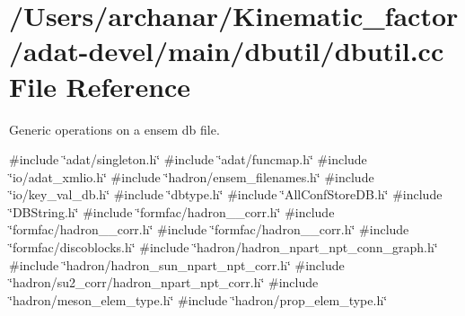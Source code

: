\hypertarget{adat-devel_2main_2dbutil_2dbutil_8cc}{}\section{/\+Users/archanar/\+Kinematic\+\_\+factor/adat-\/devel/main/dbutil/dbutil.cc File Reference}
\label{adat-devel_2main_2dbutil_2dbutil_8cc}


Generic operations on a ensem db file.  


{\ttfamily \#include \char`\"{}adat/singleton.\+h\char`\"{}}\newline
{\ttfamily \#include \char`\"{}adat/funcmap.\+h\char`\"{}}\newline
{\ttfamily \#include \char`\"{}io/adat\+\_\+xmlio.\+h\char`\"{}}\newline
{\ttfamily \#include \char`\"{}hadron/ensem\+\_\+filenames.\+h\char`\"{}}\newline
{\ttfamily \#include \char`\"{}io/key\+\_\+val\+\_\+db.\+h\char`\"{}}\newline
{\ttfamily \#include \char`\"{}dbtype.\+h\char`\"{}}\newline
{\ttfamily \#include \char`\"{}All\+Conf\+Store\+D\+B.\+h\char`\"{}}\newline
{\ttfamily \#include \char`\"{}D\+B\+String.\+h\char`\"{}}\newline
{\ttfamily \#include \char`\"{}formfac/hadron\+\_\+1pt\+\_\+corr.\+h\char`\"{}}\newline
{\ttfamily \#include \char`\"{}formfac/hadron\+\_\+2pt\+\_\+corr.\+h\char`\"{}}\newline
{\ttfamily \#include \char`\"{}formfac/hadron\+\_\+3pt\+\_\+corr.\+h\char`\"{}}\newline
{\ttfamily \#include \char`\"{}formfac/discoblocks.\+h\char`\"{}}\newline
{\ttfamily \#include \char`\"{}hadron/hadron\+\_\+npart\+\_\+npt\+\_\+conn\+\_\+graph.\+h\char`\"{}}\newline
{\ttfamily \#include \char`\"{}hadron/hadron\+\_\+sun\+\_\+npart\+\_\+npt\+\_\+corr.\+h\char`\"{}}\newline
{\ttfamily \#include \char`\"{}hadron/su2\+\_\+corr/hadron\+\_\+npart\+\_\+npt\+\_\+corr.\+h\char`\"{}}\newline
{\ttfamily \#include \char`\"{}hadron/meson\+\_\+elem\+\_\+type.\+h\char`\"{}}\newline
{\ttfamily \#include \char`\"{}hadron/prop\+\_\+elem\+\_\+type.\+h\char`\"{}}\newline
